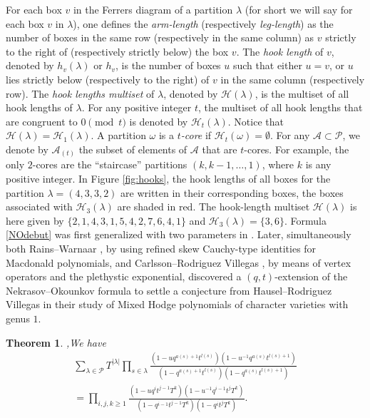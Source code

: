 \documentclass[11pt,letterpaper]{amsart}
\def\cch{\mathcal H}
\def\ccp{\mathcal P}
\newtheorem{thm}[df]{Theorem}
\numberwithin{equation}{section}
\numberwithin{df}{section}
\begin{document}
For each box $v$ in the Ferrers diagram of a partition $\lambda$ (for short we will say for each box $v$ in $\lambda$), one defines the \textit{arm-length} (respectively \textit{leg-length}) as the number of boxes in the same row (respectively in the same column) as $v$ strictly to the right of (respectively strictly below) the box $v$. The \textit{hook length} of $v$, denoted by $h_v(\lambda)$ or $h_v$, is the number of boxes $u$ such that either $u=v$, or $u$ lies strictly below (respectively to the right) of $v$ in the same column (respectively row).
The \textit{hook lengths multiset} of $\lambda$, denoted by $\mathcal{H}(\lambda)$, is the multiset of all hook lengths of $\lambda$. For any positive integer $t$, the multiset of all hook lengths that are congruent to $0 \pmod t$ is denoted by $\mathcal{H}_t(\lambda)$. Notice that $\mathcal{H}(\lambda)=\mathcal{H}_1(\lambda)$. A partition $\omega$ is a \textit{$t$-core} if $\cch_t(\omega)=\emptyset$. For any $\mathcal{A}\subset\ccp$, we denote by $\mathcal{A}_{(t)}$ the subset of elements of $\mathcal{A}$ that are $t$-cores. For example, the only $2$-cores are the ``staircase'' partitions $(k,k-1,\dots,1)$, where $k$ is any positive integer. In Figure \ref{fig:hooks}, the hook lengths of all boxes for the partition $\lambda=(4,3,3,2)$ are written in their corresponding boxes, the boxes associated with $\mathcal{H}_3(\lambda)$ are shaded in red. The hook-length multiset $\mathcal{H}(\lambda)$ is here given by $\lbrace 2,1,4,3,1,5,4,2,7,6,4,1\rbrace$ and $\mathcal{H}_3(\lambda)=\lbrace 3,6\rbrace$.
Formula \eqref{NOdebut} was first generalized with two parameters in \cite[Equation $(3.7)$]{IKS}. Later, simultaneously both Rains--Warnaar \cite{RW}, by using refined skew Cauchy-type identities for Macdonald polynomials, and Carlsson--Rodriguez Villegas \cite{CRV}, by means of vertex operators and the plethystic exponential, discovered a $(q,t)$-extension of the Nekrasov--Okounkov formula to settle a conjecture from Hausel--Rodriguez Villegas \cite[Conjecture $4.3.2$]{HRV} in their study of Mixed Hodge polynomials of character varieties with genus $1$. 
\begin{thm}\cite[Theorem $1.0.2$]{CRV},\cite[Theorem $1.3$]{RW}\label{qtNO}
We have
\begin{multline*}
\sum_{\lambda\in\ccp}T^{\lvert \lambda\rvert}\prod_{s\in\lambda}\frac{(1-uq^{a(s)+1}t^{l(s)})(1-u^{-1}q^{a(s)}t^{l(s)+1})}{(1-q^{a(s)+1}t^{l(s)})(1-q^{a(s)}t^{l(s)+1})}\\
=\prod_{i,j,k\geq 1}\frac{(1-uq^it^{j-1}T^k)(1-u^{-1}q^{i-1}t^{j}T^k)}{(1-q^{i-1}t^{j-1}T^k)(1-q^{i}t^jT^k)}.
\end{multline*}
\end{thm}
\end{document}
